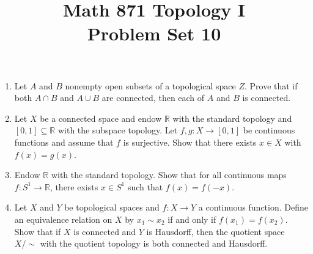 \documentclass[12pt]{article}
\title{Math 871 Topology I \\ Problem Set 10}
\author{}
\date{}
\newcommand{\R}{\mathbb{R}}
\theoremstyle{definition}
\begin{document}
\maketitle


	
\thispagestyle{fancy}
\pagestyle{fancy}



\begin{enumerate}[roomy]
\item Let $A$ and $B$ nonempty open subsets of a topological space $Z$. 
Prove that if both $A \cap B$ and $A \cup B$ are connected, then each of $A$ and $B$ is connected.

\item Let $X$ be a connected space and endow $\R$ with the standard topology and $[0,1] \subseteq \R$ with the subspace topology.
Let $f,g \colon X \longrightarrow [0,1]$ be continuous functions and assume that $f$ is surjective. 
Show that there exists $x \in X$ with $f(x) = g(x)$.

\item Endow $\R$ with the standard topology. Show that for all continuous maps $f \colon S^1 \longrightarrow \R$, there exists $x \in S^1$ such that $f(x) = f(-x)$.

\item Let $X$ and $Y$ be topological spaces and $f \colon X \longrightarrow Y$ a continuous function. Define an equivalence relation on $X$ by $x_1 \sim x_2$ if and only if $f(x_1) = f(x_2)$. 
Show that if $X$ is connected and $Y$ is Hausdorff, then the quotient space $X/\sim$ with the quotient topology is both connected and Hausdorff.

\end{enumerate}
\end{document}
